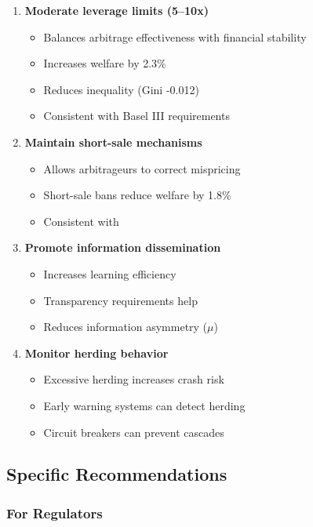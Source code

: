 \begin{enumerate}
    \item \textbf{Moderate leverage limits (5--10x)}
    \begin{itemize}
        \item Balances arbitrage effectiveness with financial stability
        \item Increases welfare by 2.3\%
        \item Reduces inequality (Gini -0.012)
        \item Consistent with Basel III requirements
    \end{itemize}
    
    \item \textbf{Maintain short-sale mechanisms}
    \begin{itemize}
        \item Allows arbitrageurs to correct mispricing
        \item Short-sale bans reduce welfare by 1.8\%
        \item Consistent with \citet{shleifer1997limits}
    \end{itemize}
    
    \item \textbf{Promote information dissemination}
    \begin{itemize}
        \item Increases learning efficiency
        \item Transparency requirements help
        \item Reduces information asymmetry ($\mu$)
    \end{itemize}
    
    \item \textbf{Monitor herding behavior}
    \begin{itemize}
        \item Excessive herding increases crash risk
        \item Early warning systems can detect herding
        \item Circuit breakers can prevent cascades
    \end{itemize}
\end{enumerate}

\subsection{Specific Recommendations}

\subsubsection{For Regulators}

